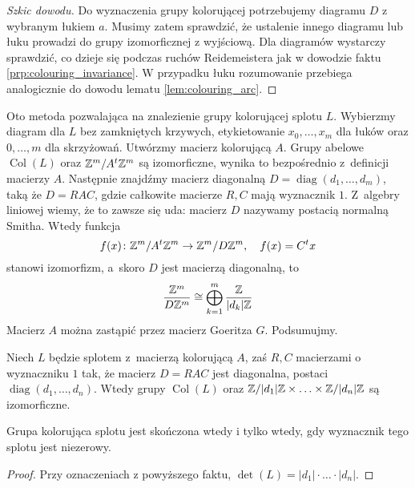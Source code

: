 \begin{proof}[Szkic dowodu]
    Do wyznaczenia grupy kolorującej potrzebujemy diagramu $D$ z wybranym łukiem $a$.
    Musimy zatem sprawdzić, że ustalenie innego diagramu lub łuku prowadzi do grupy izomorficznej z wyjściową.
    Dla diagramów wystarczy sprawdzić, co dzieje się podczas ruchów Reidemeistera jak w dowodzie faktu \ref{prp:colouring_invariance}.
    W przypadku łuku rozumowanie przebiega analogicznie do dowodu lematu \ref{lem:colouring_arc}.
\end{proof}

Oto metoda pozwalająca na znalezienie grupy kolorującej splotu $L$.
Wybierzmy diagram dla $L$ bez zamkniętych krzywych, etykietowanie $x_0, \ldots, x_m$ dla łuków oraz $0, \ldots, m$ dla skrzyżowań.
Utwórzmy macierz kolorującą $A$.
Grupy abelowe $\operatorname{Col}(L)$ oraz $\mathbb Z^m / A^t \mathbb Z^m$ są izomorficzne, wynika to bezpośrednio z~definicji macierzy $A$.
Następnie znajdźmy macierz diagonalną $D = \operatorname{diag}(d_1, \ldots, d_m)$, taką że $D = RAC$, gdzie całkowite macierze $R, C$ mają wyznacznik $1$.
Z~algebry liniowej wiemy, że to zawsze się uda: macierz $D$ nazywamy postacią normalną Smitha.
Wtedy funkcja
\begin{equation}
    f(x) \colon \mathbb Z^m/A^t \mathbb Z^m \to \mathbb Z^m / D\mathbb Z^m, \quad f(x) = C^t x
\end{equation}
stanowi izomorfizm, a~skoro $D$ jest macierzą diagonalną, to
\begin{equation}
    \frac{\mathbb Z^m}{D\mathbb Z^m} \cong \bigoplus_{k=1}^m \frac{\mathbb Z}{|d_k| \mathbb Z}
\end{equation}
Macierz $A$ można zastąpić przez macierz Goeritza $G$.
Podsumujmy.

\begin{proposition}
    Niech $L$ będzie splotem z~macierzą kolorującą $A$, zaś $R, C$ macierzami o wyznaczniku $1$ tak, że macierz $D=RAC$ jest diagonalna, postaci $\operatorname{diag}(d_1, \ldots, d_n)$.
    Wtedy grupy $\operatorname{Col}(L)$ oraz $\mathbb Z/|d_1| \mathbb Z \times \ldots \times \mathbb Z/|d_n| \mathbb Z$ są izomorficzne.
\end{proposition}

\begin{corollary}
    Grupa kolorująca splotu jest skończona wtedy i tylko wtedy, gdy wyznacznik tego splotu jest niezerowy.
\end{corollary}

\begin{proof}
    Przy oznaczeniach z powyższego faktu, $\det(L) = |d_1| \cdot \ldots \cdot |d_n|$.
\end{proof}

